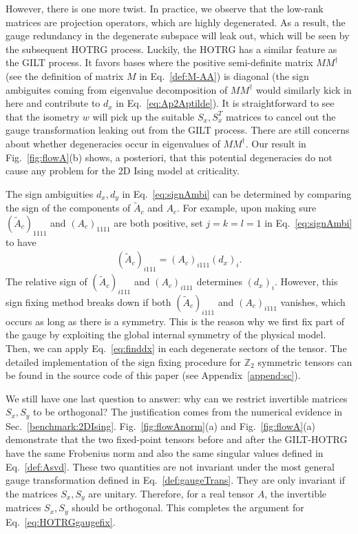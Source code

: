 \documentclass[aps,prr,reprint,superscriptaddress,floatfix]{revtex4-2}
\begin{document}
However, there is one more twist. In practice, we observe that the low-rank matrices are projection operators, which are highly degenerated. 
As a result, the gauge redundancy in the degenerate subspace will leak out, which will be seen by the subsequent HOTRG process. 
Luckily, the HOTRG has a similar feature as the GILT process.
It favors bases where the positive semi-definite matrix $M M^{\dagger}$ (see the definition of matrix $M$ in Eq.~\eqref{def:M-AA}) is diagonal (the sign ambiguites coming from eigenvalue decomposition of $M M^{\dagger}$ would similarly kick in here and contribute to $d_x$ in Eq.~\eqref{eq:Ap2Aptilde}). 
It is straightforward to see that the isometry $w$ will pick up the suitable $S_x,S_x^T$ matrices to cancel out the gauge transformation leaking out from the GILT process.
There are still concerns about whether degeneracies occur in eigenvalues of $M M^{\dagger}$. 
Our result in Fig.~\ref{fig:flowA}(b) shows, a posteriori, that this potential degeneracies do not cause any problem for the 2D Ising model at criticality.
%

The sign ambiguities $d_x,d_y$ in Eq.~\eqref{eq:signAmbi} can be determined by comparing the sign of the components of $\tilde{A}_c$ and $A_c$.
For example, upon making sure $(\tilde{A}_c)_{1111}$ and $(A_c)_{1111}$ are both positive, set $j = k = l = 1$ in Eq.~\eqref{eq:signAmbi} to have
%
\begin{align}\label{eq:finddx}
    (\tilde{A}_c)_{i111} =
    (A_c)_{i111}(d_x)_i. 
\end{align}
%
The relative sign of $(\tilde{A}_c)_{i111}$ and $(A_c)_{i111}$ determines $(d_x)_i$.
However, this sign fixing method breaks down if both $(\tilde{A}_c)_{i111}$ and $(A_c)_{i111}$ vanishes, which occurs as long as there is a symmetry.
This is the reason why we first fix part of the gauge by exploiting the global internal symmetry of the physical model.
Then, we can apply Eq.~\eqref{eq:finddx} in each degenerate sectors of the tensor.
The detailed implementation of the sign fixing procedure for $\mathbb{Z}_2$ symmetric tensors can be found in the source code of this paper (see Appendix~\ref{append:sc}).
%

We still have one last question to answer: why can we restrict invertible matrices $S_x, S_y$ to be orthogonal? 
The justification comes from the numerical evidence in Sec.~\ref{benchmark:2DIsing}.
Fig.~\ref{fig:flowAnorm}(a) and Fig.~\ref{fig:flowA}(a) demonstrate that the two fixed-point tensors before and after the GILT-HOTRG have the same Frobenius norm and also the same singular values defined in Eq.~\eqref{def:Asvd}. 
These two quantities are not invariant under the most general gauge transformation defined in Eq.~\eqref{def:gaugeTrans}. 
They are only invariant if the matrices $S_x,S_y$ are unitary. 
Therefore, for a real tensor $A$, the invertible matrices $S_x,S_y$ should be orthogonal.
This completes the argument for Eq.~\eqref{eq:HOTRGgaugefix}.
%
\end{document}
